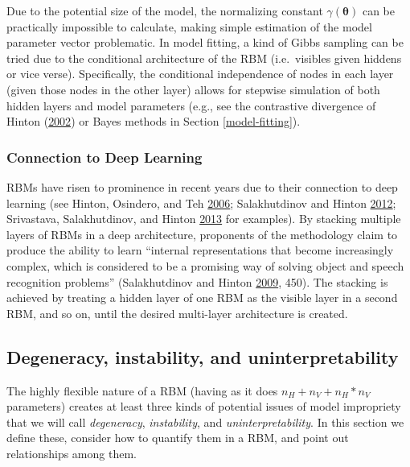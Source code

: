 \documentclass[]{article}
\theoremstyle{definition}
\newcommand{\nv}{{n_{\scriptscriptstyle V}}}
\newcommand{\nh}{{n_{\scriptscriptstyle H}}}
\begin{document}
Due to the potential size of the model, the normalizing constant
\(\gamma(\boldsymbol \theta)\) can be practically impossible to
calculate, making simple estimation of the model parameter vector
problematic. In model fitting, a kind of Gibbs sampling can be tried due
to the conditional architecture of the RBM (i.e.~visibles given hiddens
or vice verse). Specifically, the conditional independence of nodes in
each layer (given those nodes in the other layer) allows for stepwise
simulation of both hidden layers and model parameters (e.g., see the
contrastive divergence of Hinton
(\protect\hyperlink{ref-hinton2002training}{2002}) or Bayes methods in
Section \ref{model-fitting}).

\hypertarget{connection-to-deep-learning}{%
\subsubsection{Connection to Deep
Learning}\label{connection-to-deep-learning}}

RBMs have risen to prominence in recent years due to their connection to
deep learning (see Hinton, Osindero, and Teh
\protect\hyperlink{ref-hinton2006fast}{2006}; Salakhutdinov and Hinton
\protect\hyperlink{ref-salakhutdinov2012efficient}{2012}; Srivastava,
Salakhutdinov, and Hinton
\protect\hyperlink{ref-srivastava2013modeling}{2013} for examples). By
stacking multiple layers of RBMs in a deep architecture, proponents of
the methodology claim to produce the ability to learn ``internal
representations that become increasingly complex, which is considered to
be a promising way of solving object and speech recognition problems''
(Salakhutdinov and Hinton
\protect\hyperlink{ref-salakhutdinov2009deep}{2009}, 450). The stacking
is achieved by treating a hidden layer of one RBM as the visible layer
in a second RBM, and so on, until the desired multi-layer architecture
is created.

\hypertarget{degeneracy-instability-and-uninterpretability}{%
\subsection{Degeneracy, instability, and
uninterpretability}\label{degeneracy-instability-and-uninterpretability}}

The highly flexible nature of a RBM (having as it does
\(\nh + \nv + \nh*\nv\) parameters) creates at least three kinds of
potential issues of model impropriety that we will call
\emph{degeneracy}, \emph{instability}, and \emph{uninterpretability}. In
this section we define these, consider how to quantify them in a RBM,
and point out relationships among them.
\end{document}
